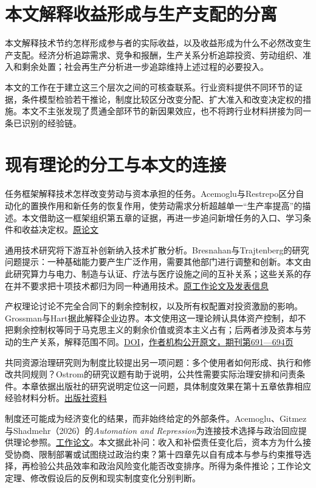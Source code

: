 \documentclass[UTF8,fontset=windows,12pt,a4paper,oneside,openany]{ctexbook}
\begin{document}
\section{本文解释收益形成与生产支配的分离}

本文解释技术节约怎样形成参与者的实际收益，以及收益形成为什么不必然改变生产支配。经济分析追踪需求、竞争和报酬，生产关系分析追踪投资、劳动组织、准入和剩余处置；社会再生产分析进一步追踪维持上述过程的必要投入。

本文的工作在于建立这三个层次之间的可核查联系。行业资料提供不同环节的证据，条件模型检验若干推论，制度比较区分改变分配、扩大准入和改变决定权的措施。本文不主张发现了贯通全部环节的新因果效应，也不将跨行业材料拼接为同一条已识别的经验链。

\section{现有理论的分工与本文的连接}

任务框架解释技术怎样改变劳动与资本承担的任务。Acemoglu与Restrepo区分自动化的置换作用和新任务的恢复作用，使劳动需求分析超越单一“生产率提高”的描述。本文借助这一框架组织第五章的证据，再进一步追问新增任务的入口、学习条件和收益决定权。\href{https://doi.org/10.1257/jep.33.2.3}{原论文}

通用技术研究将下游互补创新纳入技术扩散分析。Bresnahan与Trajtenberg的研究问题提示：一种基础能力要产生广泛作用，需要其他部门进行调整和创新。本文由此研究算力与电力、制造与认证、疗法与医疗设施之间的互补关系；这些关系的存在并不要求把十项技术都归为同一种通用技术。\href{https://www.nber.org/papers/w4148}{原工作论文及发表信息}

产权理论讨论不完全合同下的剩余控制权，以及所有权配置对投资激励的影响。Grossman与Hart据此解释企业边界。本文使用这一理论辨认具体资产控制，却不把剩余控制权等同于马克思主义的剩余价值或资本主义占有；后两者涉及资本与劳动的生产关系，解释范围不同。\href{https://doi.org/10.1086/261404}{DOI}，\href{https://dash.harvard.edu/server/api/core/bitstreams/7312037c-527a-6bd4-e053-0100007fdf3b/content}{作者机构公开原文，期刊第691—694页}

共同资源治理研究则为制度比较提出另一项问题：多个使用者如何形成、执行和修改共同规则？Ostrom的研究议题有助于说明，公共性需要实际治理安排和问责条件。本章依据出版社的研究说明定位这一问题，具体制度效果在第十五章依靠相应经验材料分析。\href{https://doi.org/10.1017/CBO9780511807763}{出版社资料}

制度还可能成为经济变化的结果，而非始终给定的外部条件。Acemoglu、Gitmez与Shadmehr（2026）的\emph{Automation and Repression}为连接技术选择与政治回应提供理论参照。\href{https://doi.org/10.3386/w35336}{工作论文}。本文据此补问：收入和补偿责任变化后，资本方为什么接受协商、限制部署或试图绕过政治约束？第十四章先以自有成本与参与约束推导选择，再检验公共品效率和政治风险变化能否改变排序。所得为条件推论；工作论文定理、修改假设后的反例和现实制度变化分别判断。
\end{document}
